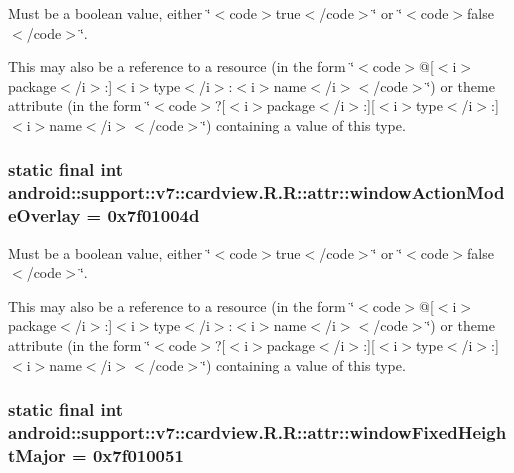 Must be a boolean value, either \char`\"{}$<$code$>$true$<$/code$>$\char`\"{} or \char`\"{}$<$code$>$false$<$/code$>$\char`\"{}. 

This may also be a reference to a resource (in the form \char`\"{}$<$code$>$@\mbox{[}$<$i$>$package$<$/i$>$:\mbox{]}$<$i$>$type$<$/i$>$:$<$i$>$name$<$/i$>$$<$/code$>$\char`\"{}) or theme attribute (in the form \char`\"{}$<$code$>$?\mbox{[}$<$i$>$package$<$/i$>$:\mbox{]}\mbox{[}$<$i$>$type$<$/i$>$:\mbox{]}$<$i$>$name$<$/i$>$$<$/code$>$\char`\"{}) containing a value of this type. \hypertarget{classandroid_1_1support_1_1v7_1_1cardview_1_1_r_1_1attr_b92dd6cea5d28ab7e3008e34ff93f5d2}{
\subsubsection[{windowActionModeOverlay}]{\setlength{\rightskip}{0pt plus 5cm}static final int android::support::v7::cardview.R.R::attr::windowActionModeOverlay = 0x7f01004d}}
\label{classandroid_1_1support_1_1v7_1_1cardview_1_1_r_1_1attr_b92dd6cea5d28ab7e3008e34ff93f5d2}


Must be a boolean value, either \char`\"{}$<$code$>$true$<$/code$>$\char`\"{} or \char`\"{}$<$code$>$false$<$/code$>$\char`\"{}. 

This may also be a reference to a resource (in the form \char`\"{}$<$code$>$@\mbox{[}$<$i$>$package$<$/i$>$:\mbox{]}$<$i$>$type$<$/i$>$:$<$i$>$name$<$/i$>$$<$/code$>$\char`\"{}) or theme attribute (in the form \char`\"{}$<$code$>$?\mbox{[}$<$i$>$package$<$/i$>$:\mbox{]}\mbox{[}$<$i$>$type$<$/i$>$:\mbox{]}$<$i$>$name$<$/i$>$$<$/code$>$\char`\"{}) containing a value of this type. \hypertarget{classandroid_1_1support_1_1v7_1_1cardview_1_1_r_1_1attr_f31d36d07789f1666785e1342e24a4e1}{
\subsubsection[{windowFixedHeightMajor}]{\setlength{\rightskip}{0pt plus 5cm}static final int android::support::v7::cardview.R.R::attr::windowFixedHeightMajor = 0x7f010051}}
\label{classandroid_1_1support_1_1v7_1_1cardview_1_1_r_1_1attr_f31d36d07789f1666785e1342e24a4e1}


